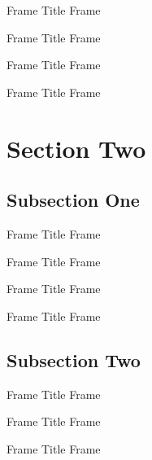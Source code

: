 \documentclass[12pt,xcolor={rgb}]{beamer}
\begin{document}
\begin{frame}{Frame Title}
Frame \insertframenumber
\end{frame}

\begin{frame}{Frame Title}
Frame \insertframenumber
\end{frame}

\begin{frame}{Frame Title}
Frame \insertframenumber
\end{frame}

\begin{frame}{Frame Title}
Frame \insertframenumber
\end{frame}

\section{Section Two}

\subsection{Subsection One}

\begin{frame}{Frame Title}
Frame \insertframenumber
\end{frame}

\begin{frame}{Frame Title}
Frame \insertframenumber
\end{frame}

\begin{frame}{Frame Title}
Frame \insertframenumber
\end{frame}

\begin{frame}{Frame Title}
Frame \insertframenumber
\end{frame}

\subsection{Subsection Two}

\begin{frame}{Frame Title}
Frame \insertframenumber
\end{frame}

\begin{frame}{Frame Title}
Frame \insertframenumber
\end{frame}

\begin{frame}{Frame Title}
Frame \insertframenumber
\end{frame}
\end{document}
